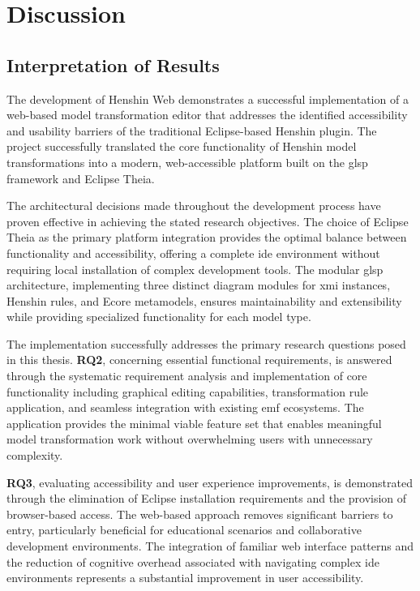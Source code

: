 \chapter{Discussion}
  \label{sec:discussion}

  \section{Interpretation of Results}
  \label{subsec:interpretation-results}

  The development of Henshin Web demonstrates a successful implementation of a web-based model transformation editor that addresses the identified accessibility and usability barriers of the traditional Eclipse-based Henshin plugin. The project successfully translated the core functionality of Henshin model transformations into a modern, web-accessible platform built on the \ac{glsp} framework and Eclipse Theia.

  The architectural decisions made throughout the development process have proven effective in achieving the stated research objectives. The choice of Eclipse Theia as the primary platform integration provides the optimal balance between functionality and accessibility, offering a complete \ac{ide} environment without requiring local installation of complex development tools. The modular \ac{glsp} architecture, implementing three distinct diagram modules for \ac{xmi} instances, Henshin rules, and Ecore metamodels, ensures maintainability and extensibility while providing specialized functionality for each model type.

  The implementation successfully addresses the primary research questions posed in this thesis. \textbf{RQ2}, concerning essential functional requirements, is answered through the systematic requirement analysis and implementation of core functionality including graphical editing capabilities, transformation rule application, and seamless integration with existing \ac{emf} ecosystems. The application provides the minimal viable feature set that enables meaningful model transformation work without overwhelming users with unnecessary complexity.

  \textbf{RQ3}, evaluating accessibility and user experience improvements, is demonstrated through the elimination of Eclipse installation requirements and the provision of browser-based access. The web-based approach removes significant barriers to entry, particularly beneficial for educational scenarios and collaborative development environments. The integration of familiar web interface patterns and the reduction of cognitive overhead associated with navigating complex \ac{ide} environments represents a substantial improvement in user accessibility.

